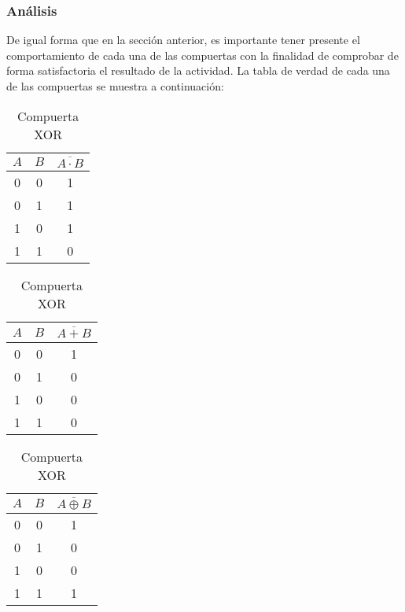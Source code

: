 \documentclass[../procedimientos.tex]{subfiles}
\begin{document}
\subsubsection{Análisis}
De igual forma que en la sección anterior, es importante tener presente el 
comportamiento de cada una de las compuertas con la finalidad de comprobar de 
forma satisfactoria el resultado de la actividad. La tabla de verdad de cada 
una de las compuertas se muestra a continuación:
\begin{table}[h!]
  \caption{Tablas de verdad (Sección B)}
  \label{tab:b_tv}
  \centering
  \begin{subtable}[t]{0.25\linewidth} %
    \centering
    \label{tab:comp_nand}
    \begin{tabular}{|c c|c|}
      \hline
      $A$ & $B$ & $\overline{A \cdot B}$\\
      \hline
      0 & 0 & 1\\
      0 & 1 & 1\\
      1 & 0 & 1\\
      1 & 1 & 0\\
      \hline
    \end{tabular}
    \caption{Compuerta NAND}
  \end{subtable}
  \begin{subtable}[t]{0.25\linewidth} %
    \centering
    \label{tab:comp_nor}
    \begin{tabular}{|c c|c|}
      \hline
      $A$ & $B$ & $\overline{A + B}$\\
      \hline
      0 & 0 & 1\\
      0 & 1 & 0\\
      1 & 0 & 0\\
      1 & 1 & 0\\
      \hline
    \end{tabular}
    \caption{Compuerta NOR}
  \end{subtable}
  \begin{subtable}[t]{0.25\linewidth} %
    \centering
    \label{tab:comp_xnor}
    \begin{tabular}{|c c|c|}
      \hline
      $A$ & $B$ & $\overline{A \oplus B}$\\
      \hline
      0 & 0 & 1\\
      0 & 1 & 0\\
      1 & 0 & 0\\
      1 & 1 & 1\\
      \hline
    \end{tabular}
    \caption{Compuerta XOR}
  \end{subtable}
\end{table}
\end{document}
